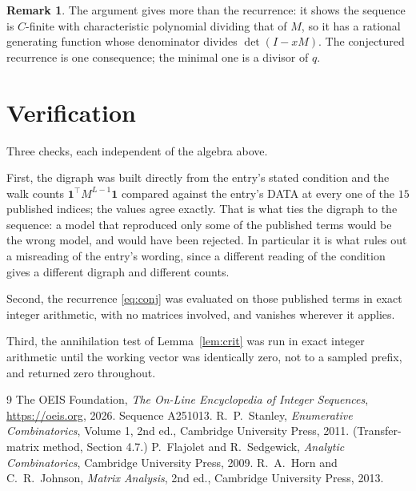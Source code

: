 \documentclass[11pt,a4paper]{article}
\theoremstyle{plain}
\theoremstyle{definition}
\newtheorem{remark}[theorem]{Remark}
\begin{document}
\begin{remark}
The argument gives more than the recurrence: it shows the sequence is $C$-finite with
characteristic polynomial dividing that of $M$, so it has a rational generating function
whose denominator divides $\det(I-xM)$. The conjectured recurrence is one consequence; the
minimal one is a divisor of $q$.
\end{remark}

\section{Verification}

Three checks, each independent of the algebra above.

First, the digraph was built directly from the entry's stated condition and the walk counts
$\mathbf{1}^{\!\top}M^{L-1}\mathbf{1}$ compared against the entry's DATA at
every one of the $15$ published indices; the values agree exactly. That is what ties
the digraph to the sequence: a model that reproduced only some of the published terms would
be the wrong model, and would have been rejected. In particular it is what rules out a
misreading of the entry's wording, since a different reading of the condition gives a
different digraph and different counts.

Second, the recurrence \eqref{eq:conj} was evaluated on those published terms in exact
integer arithmetic, with no matrices involved, and vanishes wherever it applies.

Third, the annihilation test of Lemma~\ref{lem:crit} was run in exact integer arithmetic
until the working vector was identically zero, not to a sampled prefix, and returned zero
throughout.

\begin{thebibliography}{9}
 The OEIS Foundation, \emph{The On-Line Encyclopedia of Integer
Sequences}, \url{https://oeis.org}, 2026. Sequence A251013.
 R.~P.~Stanley, \emph{Enumerative Combinatorics}, Volume 1, 2nd ed.,
Cambridge University Press, 2011. (Transfer-matrix method, Section 4.7.)
 P.~Flajolet and R.~Sedgewick, \emph{Analytic Combinatorics}, Cambridge
University Press, 2009.
 R.~A.~Horn and C.~R.~Johnson, \emph{Matrix Analysis}, 2nd ed., Cambridge
University Press, 2013.
\end{thebibliography}
\end{document}
